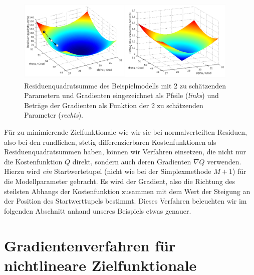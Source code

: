 \begin{figure}
\begin{center}
\includegraphics[width=0.95\textwidth, angle = 0]{03_vorlesung/media/LSopti_example1_LS_Grad.pdf}
\end{center}
\caption{Residuenquadratsumme des Beispielmodells mit 2 zu schätzenden Parametern
und Gradienten eingezeichnet als Pfeile (\textsl{links}) und Beträge der
Gradienten als Funktion der 2 zu schätzenden Parameter (\textsl{rechts}).\label{LSoptiExample1Grad}}
\end{figure}
Für zu minimierende Zielfunktionale wie wir sie bei normalverteilten Residuen, also bei
den rundlichen, stetig differenzierbaren Kostenfunktionen als Residuenquadratsummen haben, können wir Verfahren
einsetzen, die nicht nur die Kostenfunktion $Q$ direkt, sondern auch deren Gradienten $\nabla Q$ verwenden.
Hierzu wird \textsl{ein} Startwertetupel (nicht wie bei der Simplexmethode $M+1$)
für die Modellparameter gebracht. Es wird der Gradient, also die Richtung des steilsten
Abhangs der Kostenfunktion zusammen mit dem Wert der Steigung an der Position des Startwerttupels
bestimmt. Dieses Verfahren beleuchten wir im folgenden Abschnitt anhand unseres Beispiels etwas genauer.

\section{Gradientenverfahren für nichtlineare Zielfunktionale}

